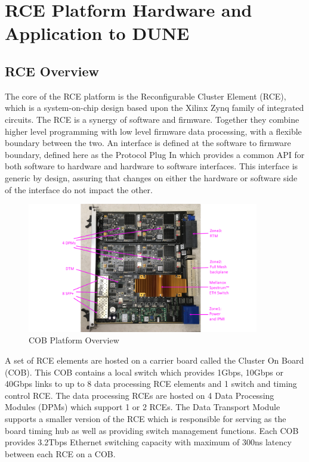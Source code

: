\section{RCE Platform Hardware and Application to DUNE}
\subsection{RCE Overview}
\label{sec:RCEPlatformOverview}

The core of the RCE platform is the Reconfigurable Cluster
Element (RCE), which is a system-on-chip design based upon
the Xilinx Zynq family of integrated circuits.
The RCE is a synergy of software and firmware. Together
they combine higher level programming with low level firmware
data processing, with a flexible boundary between the
two. An interface is defined at the software to firmware
boundary, defined here as the Protocol Plug In which provides 
a common API for both software to hardware and hardware to 
software interfaces. This interface is generic by design, 
assuring  that changes on either the hardware or software side 
of the interface do not impact the other.

\begin{figure}[tb]
\centering
\includegraphics[width=0.9\textwidth]{images/COB_C10_pic_arrow.png}
\caption{\label{fig:COB_overview}COB Platform Overview}
\end{figure}

A set of RCE elements are hosted on a carrier board called the Cluster On Board (COB). This COB contains a local switch which provides 1Gbps, 10Gbps or 40Gbps links to up to 8 data processing RCE elements and 1 switch and timing control RCE. The data processing RCEs are hosted on 4 Data Processing Modules (DPMs) which support 1 or 2 RCEs. The Data Transport Module supports a smaller version of the RCE which is responsible for serving as the board timing hub as well as providing switch management functions. Each COB provides 3.2Tbps Ethernet switching capacity with maximum of 300ns latency between each RCE on a COB. 

